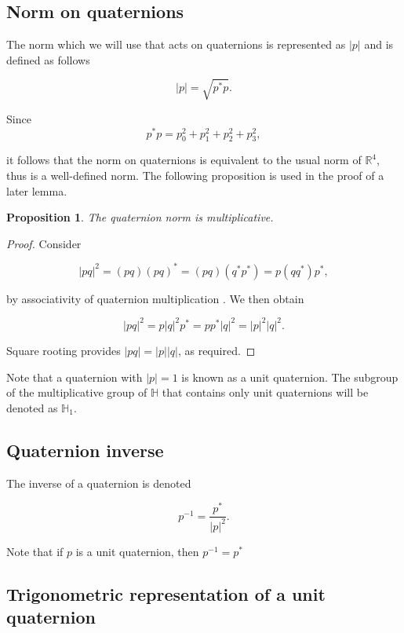 \documentclass[a4paper, 11pt]{article}
\newtheorem{proposition}{Proposition}
\begin{document}
\subsection{Norm on quaternions}

The norm which we will use that acts on quaternions is represented as \(|p|\) and is defined as follows

\[|p| = \sqrt{p^*p}.\]

Since 
\[p^*p = p_0^2 + p_1^2 + p_2^2 + p_3^2,\]

it follows that the norm on quaternions is equivalent to the usual norm of $\mathbb{R}^4$, thus is a well-defined norm. The following proposition is used in the proof of a later lemma.

\begin{proposition}

    The quaternion norm is multiplicative.
\end{proposition}

\begin{proof}
    Consider

    \[|pq|^2 = (pq)(pq)^* = (pq)(q^*p^*) = p(qq^*)p^*,\]
    
    by associativity of quaternion multiplication \citep[p.~166]{dunn_parberry_2002}. We then obtain

    \[|pq|^2 = p|q|^2p^* = pp^*|q|^2 = |p|^2|q|^2.\]

    Square rooting provides $|pq| = |p||q|$, as required.

\end{proof}

Note that a quaternion with $|p|= 1$ is known as a unit quaternion. The subgroup of the multiplicative group of $\mathbb{H}$ that contains only unit quaternions will be denoted as $\mathbb{H}_1$.

\subsection{Quaternion inverse}

The inverse of a quaternion is denoted

\[p^{-1} = \frac{p^*}{|p|^2}.\] \citep[p.~3]{jia_2013_quaternions}

Note that if \(p\) is a unit quaternion, then \(p^{-1} = p^*\)

\subsection{Trigonometric representation of a unit quaternion}
\end{document}
